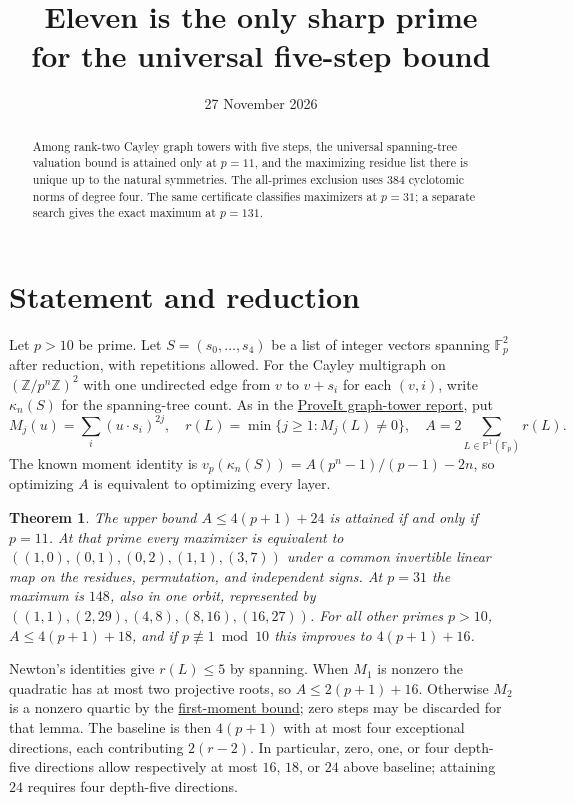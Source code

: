 \documentclass[11pt]{article}
\title{Eleven is the only sharp prime\\for the universal five-step bound}
\author{}
\date{27 November 2026}
\newtheorem{theorem}{Theorem}
\newcommand{\F}{\mathbb F}
\begin{document}
\maketitle
\vspace{-2em}
\begin{abstract}
Among rank-two Cayley graph towers with five steps, the universal
spanning-tree valuation bound is attained only at $p=11$, and
the maximizing residue list there is unique up to the natural
symmetries. The all-primes exclusion uses 384 cyclotomic norms of
degree four. The same certificate classifies maximizers at $p=31$;
a separate search gives the exact maximum at $p=131$.
\end{abstract}
\section{Statement and reduction}
Let $p>10$ be prime. Let $S=(s_0,\ldots,s_4)$ be a list of integer
vectors spanning $\F_p^2$ after reduction, with repetitions allowed.
For the Cayley multigraph on $(\mathbb Z/p^n\mathbb Z)^2$ with one
undirected edge from $v$ to $v+s_i$ for each $(v,i)$, write
$\kappa_n(S)$ for the spanning-tree count. As in the
\href{https://github.com/VladimirReshetnikov/ProveIt/blob/21c0252ffe8611baa0fbf528fbb003d6c42ca9af/Analysis/GeneralizedRiemannHypothesis/Research/grh_transfers_lubin_tate_and_graph_towers/graphs.tex}{ProveIt graph-tower report}, put
\[
 M_j(u)=\sum_i(u\cdot s_i)^{2j},\quad
 r(L)=\min\{j\ge1:M_j(L)\ne0\},\quad
 A=2\sum_{L\in\mathbb P^1(\F_p)}r(L).
\]
The known moment identity is $v_p(\kappa_n(S))=A(p^n-1)/(p-1)-2n$,
so optimizing $A$ is equivalent to optimizing every layer.
\begin{theorem}
The upper bound $A\le4(p+1)+24$ is attained if and only if $p=11$.
At that prime every maximizer is equivalent to
$((1,0),(0,1),(0,2),(1,1),(3,7))$ under a common invertible linear
map on the residues, permutation, and independent signs.
At $p=31$ the maximum is $148$, also in one orbit, represented by
$((1,1),(2,29),(4,8),(8,16),(16,27))$.
For all other primes $p>10$, $A\le4(p+1)+18$, and if
$p\not\equiv1\bmod 10$ this improves to $4(p+1)+16$.
\end{theorem}

Newton's identities give $r(L)\le5$ by spanning. When $M_1$ is
nonzero the quadratic has at most two projective roots, so
$A\le2(p+1)+16$. Otherwise $M_2$ is a nonzero quartic by the
\href{https://github.com/VladimirReshetnikov/ProveIt/blob/21c0252ffe8611baa0fbf528fbb003d6c42ca9af/Analysis/GeneralizedRiemannHypothesis/Research/grh_transfer_extensions_2026-11-26/sections/graph_extremum.tex}{first-moment bound}; zero steps may be discarded for that lemma.
The baseline is then $4(p+1)$ with at most four exceptional
directions, each contributing $2(r-2)$. In particular, zero, one,
or four depth-five directions allow respectively at most $16$, $18$,
or $24$ above baseline; attaining $24$ requires four depth-five directions.
\end{document}
